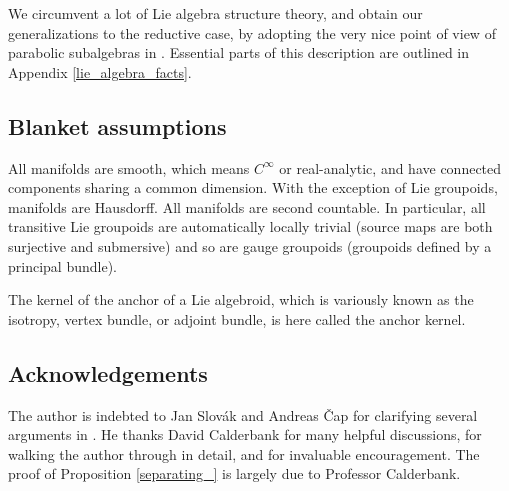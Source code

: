\documentclass[leqno,12pt]{amsart} %
\newcommand\refreshpage{\newpage}
\newcommand\refreshpage{}
\begin{document}
We circumvent a lot of Lie algebra structure theory, and obtain our generalizations to the
reductive case, by adopting the very nice point of view of parabolic subalgebras in
\cite{Calderbank_Noppakaew_16}. Essential parts of this description are outlined in
Appendix \ref{lie_algebra_facts}.

\subsection*{Blanket assumptions}
All manifolds are smooth, which means $C^\infty$ or real-analytic, and have connected
components sharing a common dimension. With the exception of Lie groupoids, manifolds are
Hausdorff. All manifolds are second countable. In particular, all transitive
Lie groupoids are automatically locally trivial (source maps are both surjective and
submersive) \cite[Proposition A.3]{Trentinaglia_15} and so are gauge groupoids (groupoids
defined by a principal bundle).

The kernel of the anchor of a Lie algebroid, which is variously known as the isotropy,
vertex bundle, or adjoint bundle, is here called the {\df anchor kernel}.

\subsection*{Acknowledgements} The author is indebted to Jan Slov\'ak and Andreas \v{C}ap
for clarifying several arguments in \cite{Cap_Slovak_09}. He thanks David Calderbank for
many helpful discussions, for walking the author through \cite{Calderbank_Noppakaew_16} in
detail, and for invaluable encouragement. The proof of Proposition \ref{separating_}
is largely due to Professor Calderbank.

\refreshpage
\end{document}
